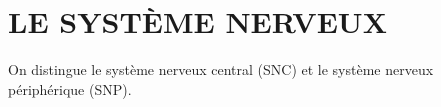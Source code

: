 \chapter{LE SYSTÈME NERVEUX}

On distingue le système nerveux central (SNC) et le système nerveux périphérique (SNP).\par

